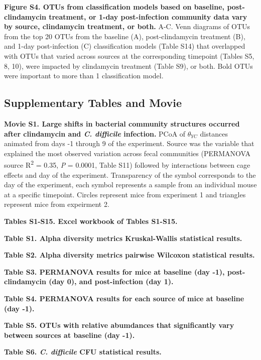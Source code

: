 \documentclass[
  11pt,
]{article}
\begin{document}
\newpage

\textbf{Figure S4. OTUs from classification models based on baseline,
post-clindamycin treatment, or 1-day post-infection community data vary
by source, clindamycin treatment, or both.} A-C. Venn diagrams of OTUs
from the top 20 OTUs from the baseline (A), post-clindamycin treatment
(B), and 1-day post-infection (C) classification models (Table S14) that
overlapped with OTUs that varied across sources at the corresponding
timepoint (Tables S5, 8, 10), were impacted by clindamycin treatment
(Table S9), or both. Bold OTUs were important to more than 1
classification model.

\newpage

\hypertarget{supplementary-tables-and-movie}{%
\subsection{Supplementary Tables and
Movie}\label{supplementary-tables-and-movie}}

\textbf{Movie S1. Large shifts in bacterial community structures
occurred after clindamycin and \emph{C. difficile} infection.} PCoA of
\(\theta_{YC}\) distances animated from days -1 through 9 of the
experiment. Source was the variable that explained the most observed
variation across fecal communities (PERMANOVA source
R\textsuperscript{2} = 0.35, \emph{P} = 0.0001, Table S11) followed by
interactions between cage effects and day of the experiment.
Transparency of the symbol corresponds to the day of the experiment,
each symbol represents a sample from an individual mouse at a specific
timepoint. Circles represent mice from experiment 1 and triangles
represent mice from expeirment 2.

\textbf{Tables S1-S15. Excel workbook of Tables S1-S15.}

\textbf{Table S1. Alpha diversity metrics Kruskal-Wallis statistical
results.}

\textbf{Table S2. Alpha diversity metrics pairwise Wilcoxon statistical
results.}

\textbf{Table S3. PERMANOVA results for mice at baseline (day -1),
post-clindamycin (day 0), and post-infection (day 1).}

\textbf{Table S4. PERMANOVA results for each source of mice at baseline
(day -1).}

\textbf{Table S5. OTUs with relative abumdances that significantly vary
between sources at baseline (day -1).}

\textbf{Table S6. \emph{C. difficile} CFU statistical results.}
\end{document}
